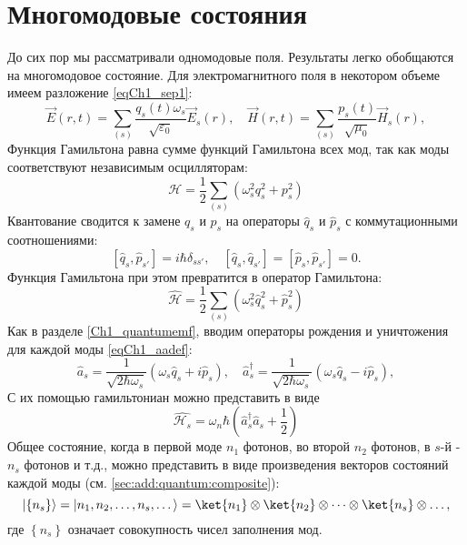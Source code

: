 \section{Многомодовые состояния}
До сих пор мы рассматривали одномодовые поля. Результаты легко
обобщаются на многомодовое состояние. Для электромагнитного поля в
некотором объеме имеем разложение \eqref{eqCh1_sep1}:
\begin{equation}
\vec{E}\left(r, t\right) = \sum_{(s)}
\frac{q_s\left(t\right) \omega_s}{\sqrt{\varepsilon_0}} \vec{E}_s\left(r\right),
\quad
\vec{H}\left(r, t\right) = \sum_{(s)}
\frac{p_s\left(t\right)}{\sqrt{\mu_0}} \vec{H}_s\left(r\right),
\end{equation}
Функция Гамильтона равна сумме функций Гамильтона всех мод, так как
моды соответствуют независимым осцилляторам: 
\begin{equation}
\mathcal{H} = \frac{1}{2} 
\sum_{(s)} \left(\omega_s^2 q_s^2 + p_s^2 \right)
\end{equation}
Квантование сводится к замене $q_s$ и $p_s$   на операторы $\hat{q}_s$
и $\hat{p}_s$ с коммутационными соотношениями: 
\begin{equation}
\left[\hat{q}_s, \hat{p}_{s'}\right] = i\hbar \delta_{ss'},
\quad 
\left[\hat{q}_s, \hat{q}_{s'}\right] = \left[\hat{p}_s,
  \hat{p}_{s'}\right] = 0.
\end{equation}
Функция Гамильтона при этом превратится в оператор Гамильтона:
\begin{equation}
\hat{\mathcal{H}} = \frac{1}{2} \sum_{(s)} \left(\omega_s^2 \hat{q}_s^2 + \hat{p}_s^2 \right)
\end{equation}
Как в разделе \ref{Ch1_quantumemf}, вводим операторы рождения и
уничтожения для каждой моды \eqref{eqCh1_aadef}: 
\begin{equation}
\hat{a}_s = \frac{1}{\sqrt{2 \hbar \omega_s}}
\left( \omega_s \hat{q}_s + i \hat{p}_s\right),
\quad
\hat{a}_s^{\dag} = \frac{1}{\sqrt{2 \hbar \omega_s}}
\left( \omega_s \hat{q}_s - i \hat{p}_s\right),
\end{equation}
С их помощью гамильтониан можно представить в виде
\begin{equation}
\hat{\mathcal{H}_s} = \omega_n \hbar 
\left(\hat{a}_s^{\dag} \hat{a}_s + \frac{1}{2}\right)
\nonumber
\end{equation}
Общее состояние, когда в первой моде $n_1$ фотонов, во второй $n_2$
фотонов, в  $s$-й - $n_s$ фотонов и т.д., можно представить в виде
произведения векторов состояний каждой моды (см.
\autoref{sec:add:quantum:composite}):  
\begin{equation}
\left|\left\{n_s\right\}\right> = 
\left|n_1, n_2, \dots, n_s, \dots\right> =
\ket{n_1} \otimes
\ket{n_2} \otimes
\dots
\otimes
\ket{n_s} \otimes
\dots, 
\nonumber
\end{equation}
где $\left\{n_s\right\}$ означает совокупность чисел заполнения мод.

